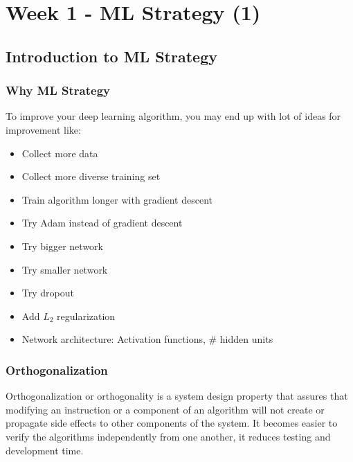 \section{Week 1 - ML Strategy (1)}
\subsection{Introduction to ML Strategy}
\subsubsection{Why ML Strategy}
To improve your deep learning algorithm, you may end up with lot of ideas for improvement like:
\begin{itemize}
    \item Collect more data
    \item Collect more diverse training set
    \item Train algorithm longer with gradient descent
    \item Try Adam instead of gradient descent
    \item Try bigger network
    \item Try smaller network
    \item Try dropout
    \item Add $L_2$ regularization
    \item Network architecture: Activation functions, \# hidden units
\end{itemize}
\subsubsection{Orthogonalization}
Orthogonalization or orthogonality is a system design property that assures that modifying an instruction or a component of an algorithm will not create or propagate side effects to other components of the system. It becomes easier to verify the algorithms independently from one another, it reduces testing and development time.

